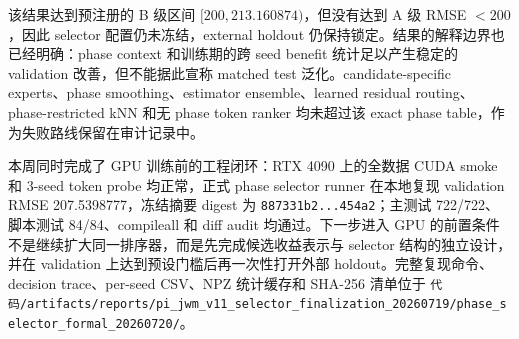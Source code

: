 \documentclass[UTF8,a4paper,11pt]{ctexart}
\newcommand{\code}[1]{\texttt{#1}}
\begin{document}
该结果达到预注册的 B 级区间 $[200,213.160874)$，但没有达到 A 级 RMSE $<200$，因此 selector 配置仍未冻结，external holdout 仍保持锁定。结果的解释边界也已经明确：phase context 和训练期的跨 seed benefit 统计足以产生稳定的 validation 改善，但不能据此宣称 matched test 泛化。candidate-specific experts、phase smoothing、estimator ensemble、learned residual routing、phase-restricted kNN 和无 phase token ranker 均未超过该 exact phase table，作为失败路线保留在审计记录中。

本周同时完成了 GPU 训练前的工程闭环：RTX 4090 上的全数据 CUDA smoke 和 3-seed token probe 均正常，正式 phase selector runner 在本地复现 validation RMSE 207.5398777，冻结摘要 digest 为 \code{887331b2...454a2}；主测试 722/722、脚本测试 84/84、compileall 和 diff audit 均通过。下一步进入 GPU 的前置条件不是继续扩大同一排序器，而是先完成候选收益表示与 selector 结构的独立设计，并在 validation 上达到预设门槛后再一次性打开外部 holdout。完整复现命令、decision trace、per-seed CSV、NPZ 统计缓存和 SHA-256 清单位于 \code{代码/artifacts/reports/pi\_jwm\_v11\_selector\_finalization\_20260719/phase\_selector\_formal\_20260720/}。
\end{document}
